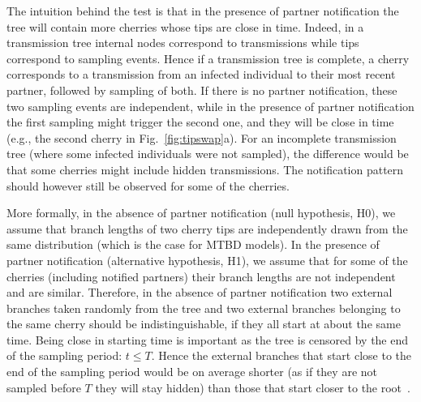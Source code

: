 \documentclass[10pt,letterpaper]{article}
\begin{document}
The intuition behind the test is that in the presence of partner notification the tree will contain more cherries whose tips are close in time. Indeed, in a transmission tree internal nodes correspond to transmissions while tips correspond to sampling events. Hence if a transmission tree is complete, a cherry corresponds to a transmission from an infected individual to their most recent partner, followed by sampling of both. If there is no partner notification, these two sampling events are independent, while in the presence of partner notification the first sampling might trigger the second one, and they will be close in time (e.g., the second cherry in Fig.~\ref{fig:tipswap}a). For an incomplete transmission tree (where some infected individuals were not sampled), the difference would be that some cherries might include hidden transmissions. The notification pattern should however still be observed for some of the cherries.

More formally, in the absence of partner notification (null hypothesis, H0), we assume that branch lengths of two cherry tips are independently drawn from the same distribution (which is the case for MTBD models). In the presence of partner notification (alternative hypothesis, H1), we assume that for some of the cherries (including notified partners) their branch lengths are not independent and are similar. Therefore, in the absence of partner notification two external branches taken randomly from the tree and two external branches belonging to the same cherry should be indistinguishable, if they all start at about the same time. Being close in starting time is important as the tree is censored by the end of the sampling period: $t \leq T$. Hence the external branches that start close to the end of the sampling period would be on average shorter (as if they are not sampled before $T$ they will stay hidden) than those that start closer to the root~\cite{mooersBranchLengthsBirth2012}. %
\end{document}
